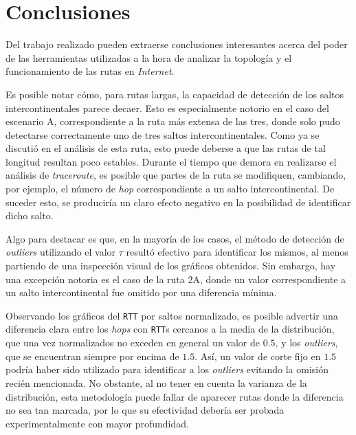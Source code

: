 \section{Conclusiones}

Del trabajo realizado pueden extraerse conclusiones interesantes acerca del
poder de las herramientas utilizadas a la hora de analizar la topología y el
funcionamiento de las rutas en \emph{Internet}.

Es posible notar cómo, para rutas largas, la capacidad de detección de los
saltos intercontinentales parece decaer. Esto es especialmente notorio en el
caso del escenario A, correspondiente a la ruta más extensa de las tres, donde
solo pudo detectarse correctamente uno de tres saltos intercontinentales. Como
ya se discutió en el análisis de esta ruta, esto puede deberse a que las
rutas de tal longitud resultan poco estables. Durante el tiempo que demora
en realizarse el análisis de \emph{traceroute}, es posible que partes de la
ruta se modifiquen, cambiando, por ejemplo, el número de \emph{hop}
correspondiente a un salto intercontinental. De suceder esto, se produciría
un claro efecto negativo en la posibilidad de identificar dicho salto.

Algo para destacar es que, en la mayoría de los casos, el método de detección
de \emph{outliers} utilizando el valor $\tau$ resultó efectivo para
identificar los mismos, al menos partiendo de una inspección visual de los
gráficos obtenidos. Sin embargo, hay una excepción notoria es el caso de la
ruta 2A, donde un valor correspondiente a un salto intercontinental fue
omitido por una diferencia mínima.

Observando los gráficos del \texttt{RTT} por saltos normalizado, es posible
advertir una diferencia clara entre los \emph{hops} con \texttt{RTT}s cercanos
a la media de la distribución, que una vez normalizados no exceden en general
un valor de $0.5$, y los \emph{outliers}, que se encuentran siempre por encima
de $1.5$. Así, un valor de corte fijo en $1.5$ podría haber sido utilizado
para identificar a los \emph{outliers} evitando la omisión recién mencionada.
No obstante, al no tener en cuenta la varianza de la distribución, esta
metodología puede fallar de aparecer rutas donde la diferencia no sea tan
marcada, por lo que su efectividad debería ser probada experimentalmente con
mayor profundidad.
